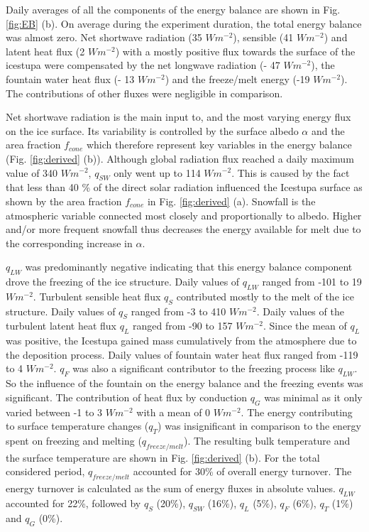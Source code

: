 \documentclass[utf8]{frontiersSCNS} %
\begin{document}
Daily averages of all the components of the energy balance are shown in Fig.  \ref{fig:EB} (b). On average during the
experiment duration, the total energy balance was almost zero. Net shortwave radiation (35 $Wm^{-2}$), sensible (41
$Wm^{-2}$) and latent heat flux (2 $Wm^{-2}$) with a mostly positive flux towards the surface of the icestupa were
compensated by the net longwave radiation (- 47 $Wm^{-2}$), the fountain water heat flux (- 13 $Wm^{-2}$) and the
freeze/melt energy (-19 $Wm^{-2}$). The contributions of other fluxes were negligible in comparison.

Net shortwave radiation is the main input to, and the most varying energy flux on the ice surface. Its variability is
controlled by the surface albedo $\alpha$ and the area fraction $f_{cone}$ which therefore represent key variables in
the energy balance (Fig. \ref{fig:derived} (b)). Although global radiation flux reached a daily maximum value of 340
$Wm^{-2}$, $q_{SW}$ only went up to 114 $Wm^{-2}$. This is caused by the fact that less than 40 \% of the direct solar
radiation influenced the Icestupa surface as shown by the area fraction $f_{cone}$ in Fig. \ref{fig:derived} (a).
Snowfall is the atmospheric variable connected most closely and proportionally to albedo.  Higher and/or more frequent
snowfall thus decreases the energy available for melt due to the corresponding increase in $\alpha$. 

$q_{LW}$ was predominantly negative indicating that this energy balance component drove the freezing of the ice
structure. Daily values of $q_{LW}$ ranged from -101 to 19 $Wm^{-2}$.  Turbulent sensible heat flux $q_{S}$ contributed
mostly to the melt of the ice structure. Daily values of $q_{S}$ ranged from -3 to 410 $Wm^{-2}$.  Daily values of the
turbulent latent heat flux $q_{L}$ ranged from -90 to 157 $Wm^{-2}$.  Since the mean of $q_{L}$ was positive, the
Icestupa gained mass cumulatively from the atmosphere due to the deposition process.  Daily values of fountain water
heat flux  ranged from -119 to 4 $Wm^{-2}$. $q_{F}$ was also a significant contributor to the freezing process like
$q_{LW}$. So the influence of the fountain on the energy balance and the freezing events was significant. The
contribution of heat flux by conduction $q_{G}$ was minimal as it only varied between -1 to 3 $Wm^{-2}$ with a
mean of 0 $Wm^{-2}$. The energy contributing to surface temperature changes ($q_{T}$) was insignificant in comparison to
the energy spent on freezing and melting ($q_{freeze/melt}$). The resulting bulk temperature and the surface temperature
are shown in Fig. \ref{fig:derived} (b).  For the total considered period, $q_{freeze/melt}$  accounted
for 30\% of overall energy turnover. The energy turnover is calculated as the sum of energy fluxes in absolute values.
$q_{LW}$ accounted for 22\%, followed by $q_{S}$ (20\%), $q_{SW}$ (16\%), $q_{L}$ (5\%), $q_{F}$ (6\%), $q_{T}$ (1\%)
and $q_{G}$ (0\%).
\end{document}
